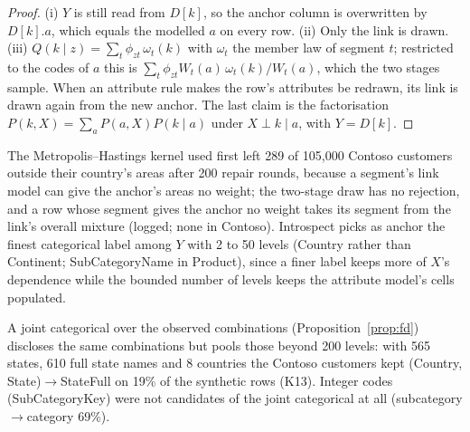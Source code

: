 \begin{proof}
(i) $Y$ is still read from $D[k]$, so the anchor column is overwritten by $D[k].a$, which equals the modelled $a$ on every row. (ii) Only the link is drawn. (iii) $Q(k\mid z)=\sum_t\phi_{zt}\,\omega_t(k)$ with $\omega_t$ the member law of segment $t$; restricted to the codes of $a$ this is $\sum_t\phi_{zt}W_t(a)\,\omega_t(k)/W_t(a)$, which the two stages sample. When an attribute rule makes the row's attributes be redrawn, its link is drawn again from the new anchor. The last claim is the factorisation $P(k,X)=\sum_a P(a,X)P(k\mid a)$ under $X\perp k\mid a$, with $Y=D[k]$.
\end{proof}
\noindent The Metropolis--Hastings kernel used first left 289 of 105{,}000 Contoso customers outside their country's areas after 200 repair rounds, because a segment's link model can give the anchor's areas no weight; the two-stage draw has no rejection, and a row whose segment gives the anchor no weight takes its segment from the link's overall mixture (logged; none in Contoso). Introspect picks as anchor the finest categorical label among $Y$ with 2 to 50 levels (Country rather than Continent; SubCategoryName in Product), since a finer label keeps more of $X$'s dependence while the bounded number of levels keeps the attribute model's cells populated.

\noindent A joint categorical over the observed combinations (Proposition~\ref{prop:fd}) discloses the same combinations but pools those beyond 200 levels: with 565 states, 610 full state names and 8 countries the Contoso customers kept (Country, State)$\to$StateFull on 19\% of the synthetic rows (K13). Integer codes (SubCategoryKey) were not candidates of the joint categorical at all (subcategory$\to$category 69\%).

